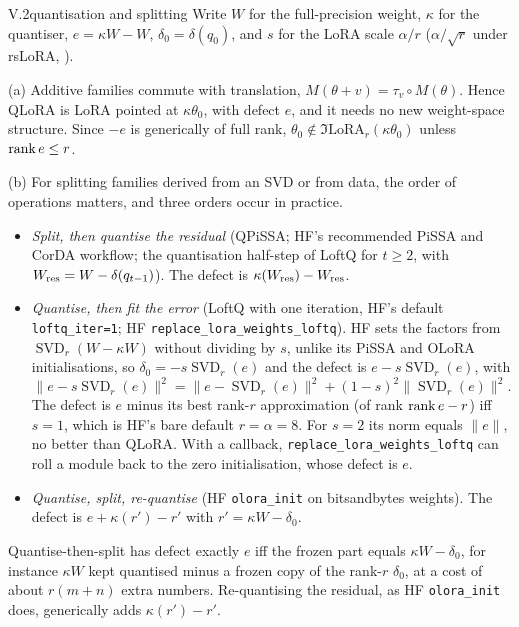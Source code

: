 \begin{proposition}{V.2}{quantisation and splitting}
Write $W$ for the full-precision weight, $\kappa$ for the quantiser, $e=\kappa W-W$, $\delta_0=\delta(q_0)$, and $s$
for the LoRA scale $\alpha/r$ ($\alpha/\sqrt r$ under rsLoRA, \citealp{kalajdzievski2023rank}).

(a) Additive families commute with translation, $M(\theta+v)=\tau_v\circ M(\theta)$. Hence QLoRA is LoRA pointed at
$\kappa\theta_0$, with defect $e$, and it needs no new weight-space structure. Since $-e$ is generically of full rank,
$\theta_0\notin\Im\mathrm{LoRA}_r(\kappa\theta_0)$ unless $\operatorname{rank} e\le r$.

(b) For splitting families derived from an SVD or from data, the order of operations matters, and three orders occur
in practice.
\begin{itemize}
  \item \emph{Split, then quantise the residual} (QPiSSA; HF's recommended PiSSA and CorDA workflow; the quantisation
  half-step of LoftQ for $t\ge2$, with $W_{\rm res}=W-\delta(q_{t-1})$). The defect is $\kappa(W_{\rm res})-W_{\rm res}$.
  \item \emph{Quantise, then fit the error} (LoftQ with one iteration, HF's default \texttt{loftq\_iter=1}; HF
  \texttt{replace\_\allowbreak lora\_\allowbreak weights\_\allowbreak loftq}). HF sets the factors from
  $\operatorname{SVD}_r(W-\kappa W)$ without dividing by $s$, unlike its PiSSA and OLoRA initialisations, so
  $\delta_0=-s\operatorname{SVD}_r(e)$ and the defect is $e-s\operatorname{SVD}_r(e)$, with
  \[\lVert e-s\operatorname{SVD}_r(e)\rVert^2=\lVert e-\operatorname{SVD}_r(e)\rVert^2+(1-s)^2\lVert\operatorname{SVD}_r(e)\rVert^2.\]
  The defect is $e$ minus its best rank-$r$ approximation (of rank $\operatorname{rank} e-r$) iff $s=1$, which is HF's bare default
  $r=\alpha=8$. For $s=2$ its norm equals $\lVert e\rVert$, no better than QLoRA. With a callback,
  \texttt{replace\_\allowbreak lora\_\allowbreak weights\_\allowbreak loftq} can roll a module back to the zero
  initialisation, whose defect is $e$.
  \item \emph{Quantise, split, re-quantise} (HF \texttt{olora\_init} on bitsandbytes weights). The defect is
  $e+\kappa(r')-r'$ with $r'=\kappa W-\delta_0$.
\end{itemize}
Quantise-then-split has defect exactly $e$ iff the frozen part equals $\kappa W-\delta_0$, for instance $\kappa W$ kept
quantised minus a frozen copy of the rank-$r$ $\delta_0$, at a cost of about $r(m+n)$ extra numbers. Re-quantising the
residual, as HF \texttt{olora\_init} does, generically adds $\kappa(r')-r'$.


\end{proposition}
